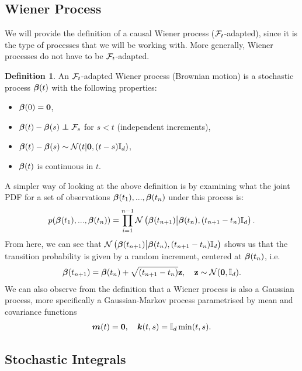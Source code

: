 \documentclass[a4paper,12pt,twoside,openright]{report}
\theoremstyle{definition}
\newtheorem{definition}{Definition}[section]
\begin{document}
\subsection{Wiener Process}

We will provide the definition of a causal Wiener process (${\mathcal{F}}_t$-adapted), since it is the type of processes that we will be working with. More generally, Wiener processes do not have to be ${\mathcal{F}}_t$-adapted.
\begin{definition}
    An ${\mathcal{F}}_t$-adapted Wiener process (Brownian motion) is a stochastic process ${\bm{\beta}}(t)$ with the following properties:
    \begin{itemize}
        \item ${\bm{\beta}}(0) = {\bm{0}}$,
        \item  $\rvw(t) - \rvw(s) \independent \calF_s$  for $s < t$ (independent increments),
        \item ${\bm{\beta}}(t) - {\bm{\beta}}(s) \sim {\mathcal{N}} (t | {\bm{0}},  (t - s) {\mathbb{I}_d}) $,
        \item ${\bm{\beta}}(t)$ is continuous in $t$.
    \end{itemize}
\end{definition}
A simpler way of looking at the above definition is by examining what the joint PDF for a set of observations ${\bm{\beta}}(t_1), ..., {\bm{\beta}}(t_n)$ under this process is:
\begin{align*}
    p({\bm{\beta}}(t_1), ..., {\bm{\beta}}(t_n)) = \prod_{i=1}^{n-1} {\mathcal{N}}\left({\bm{\beta}}(t_{n+1})\big| {\bm{\beta}}(t_{n}), (t_{n+1}- t_{n}){\mathbb{I}_d} \right).
\end{align*}
From here, we can see that ${\mathcal{N}}\left({\bm{\beta}}(t_{n+1})\big| {\bm{\beta}}(t_{n}), (t_{n+1}- t_{n}){\mathbb{I}_d} \right)$ shows us that the transition probability is given by a random increment, centered at  ${\bm{\beta}}(t_{n})$, i.e.
\begin{align*}
    {\bm{\beta}}(t_{n+1}) = {\bm{\beta}}(t_{n}) +  \sqrt{(t_{n+1}- t_{n})}{\mathbf{z}} , \quad {\mathbf{z}} \sim {\mathcal{N}}({\bm{0}}, {\mathbb{I}_d}) .
\end{align*}
We can also observe from the definition that a Wiener process is also a Gaussian process, more specifically a Gaussian-Markov process parametrised by mean and covariance functions
\begin{align*}
    {\bm{m}}(t) = {\bm{0}}, \quad {\bm{k}}(t, s) = {\mathbb{I}_d}\min(t, s).
\end{align*}

\subsection{Stochastic Integrals}
\end{document}
